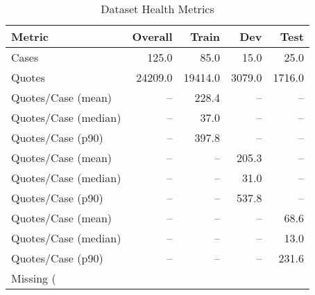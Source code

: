 \begin{table}[htbp]
\centering
\caption{Dataset Health Metrics}
\label{tab:dataset_health}
\begin{tabular}{lrrrr}
\toprule
Metric & Overall & Train & Dev & Test \\
\midrule
Cases & 125.0 & 85.0 & 15.0 & 25.0 \\
Quotes & 24209.0 & 19414.0 & 3079.0 & 1716.0 \\
Quotes/Case (mean) & -- & 228.4 & -- & -- \\
Quotes/Case (median) & -- & 37.0 & -- & -- \\
Quotes/Case (p90) & -- & 397.8 & -- & -- \\
Quotes/Case (mean) & -- & -- & 205.3 & -- \\
Quotes/Case (median) & -- & -- & 31.0 & -- \\
Quotes/Case (p90) & -- & -- & 537.8 & -- \\
Quotes/Case (mean) & -- & -- & -- & 68.6 \\
Quotes/Case (median) & -- & -- & -- & 13.0 \\
Quotes/Case (p90) & -- & -- & -- & 231.6 \\
Missing (%
\bottomrule
\end{tabular}
\end{table}
